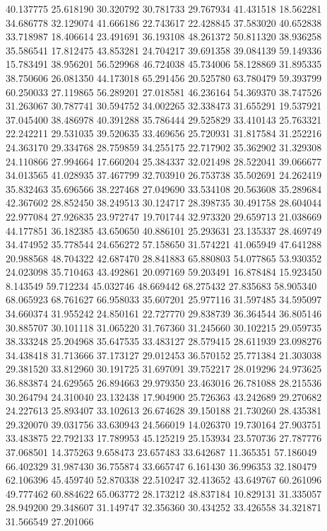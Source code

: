 40.137775
25.618190
30.320792
30.781733
29.767934
41.431518
18.562281
34.686778
32.129074
41.666186
22.743617
22.428845
37.583020
40.652838
33.718987
18.406614
23.491691
36.193108
48.261372
50.811320
38.936258
35.586541
17.812475
43.853281
24.704217
39.691358
39.084139
59.149336
15.783491
38.956201
56.529968
46.724038
45.734006
58.128869
31.895335
38.750606
26.081350
44.173018
65.291456
20.525780
63.780479
59.393799
60.250033
27.119865
56.289201
27.018581
46.236164
54.369370
38.747526
31.263067
30.787741
30.594752
34.002265
32.338473
31.655291
19.537921
37.045400
38.486978
40.391288
35.786444
29.525829
33.410143
25.763321
22.242211
29.531035
39.520635
33.469656
25.720931
31.817584
31.252216
24.363170
29.334768
28.759859
34.255175
22.717902
35.362902
31.329308
24.110866
27.994664
17.660204
25.384337
32.021498
28.522041
39.066677
34.013565
41.028935
37.467799
32.703910
26.753738
35.502691
24.262419
35.832463
35.696566
38.227468
27.049690
33.534108
20.563608
35.289684
42.367602
28.852450
38.249513
30.124717
28.398735
30.491758
28.604044
22.977084
27.926835
23.972747
19.701744
32.973320
29.659713
21.038669
44.177851
36.182385
43.650650
40.886101
25.293631
23.135337
28.469749
34.474952
35.778544
24.656272
57.158650
31.574221
41.065949
47.641288
20.988568
48.704322
42.687470
28.841883
65.880803
54.077865
53.930352
24.023098
35.710463
43.492861
20.097169
59.203491
16.878484
15.923450
8.143549
59.712234
45.032746
48.669442
68.275432
27.835683
58.905340
68.065923
68.761627
66.958033
35.607201
25.977116
31.597485
34.595097
34.660374
31.955242
24.850161
22.727770
29.838739
36.364544
36.805146
30.885707
30.101118
31.065220
31.767360
31.245660
30.102215
29.059735
38.333248
25.204968
35.647535
33.483127
28.579415
28.611939
23.098276
34.438418
31.713666
37.173127
29.012453
36.570152
25.771384
21.303038
29.381520
33.812960
30.191725
31.697091
39.752217
28.019296
24.973625
36.883874
24.629565
26.894663
29.979350
23.463016
26.781088
28.215536
30.264794
24.310040
23.132438
17.904900
25.726363
43.242689
29.270682
24.227613
25.893407
33.102613
26.674628
39.150188
21.730260
28.435381
29.320070
39.031756
33.630943
24.566019
14.026370
19.730164
27.903751
33.483875
22.792133
17.789953
45.125219
25.153934
23.570736
27.787776
37.068501
14.375263
9.658473
23.657483
33.642687
11.365351
57.186049
66.402329
31.987430
36.755874
33.665747
6.161430
36.996353
32.180479
62.106396
45.459740
52.870338
22.510247
32.413652
43.649767
60.261096
49.777462
60.884622
65.063772
28.173212
48.837184
10.829131
31.335057
28.949200
29.348607
31.149747
32.356360
30.434252
33.426558
34.321871
31.566549
27.201066
